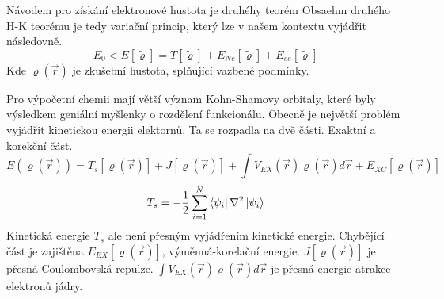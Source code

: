 \documentclass[
  digital, %
  table,   %
  lof,     %
  lot,     %
  oneside,
]{fithesis3}
\begin{document}
Návodem pro získání elektronové hustota je druhéhy teorém Obsaehm druhého H-K teorému je tedy variační princip, který lze v našem kontextu vyjádřit následovně.
\begin{equation}
E_0 < E [\tilde{\varrho}] = T[\tilde{\varrho}] + E_{Ne}[\tilde{\varrho}] + E_{ee}[\tilde{\varrho}]
\end{equation}
Kde $\tilde{\varrho}(\vec{r})$ je zkušební hustota, splňující vazbené podmínky.

 Pro výpočetní chemii mají větší význam Kohn-Shamovy orbitaly, které byly výsledkem geniální myšlenky o rozdělení funkcionálu. Obecně je největší problém vyjádřit kinetickou energii elektornů. Ta se rozpadla na dvě části. Exaktní a korekční část.
\begin{equation}
E(\varrho(\vec{r})) = T_s[\varrho(\vec{r})] + J[\varrho(\vec{r})] + \int V_{EX}(\vec{r})\varrho(\vec{r})d\vec{r} + E_{XC}[\varrho(\vec{r})]
\end{equation}
 \cite{jensen2007introduction}\cite{koch2000chemist}
 \begin{equation}
 T_s = -\frac{1}{2} \sum_{i=1}^{N}  \bra{\psi_i}{\nabla^{2}}\ket{\psi_i}
 \label{kineticka_energie_jednoelektronova}
 \end{equation}
 Kinetická energie $T_s$ ale není přesným vyjádřením kinetické energie. Chybějící část je zajištěna $E_{EX}[\varrho(\vec{r})]$, výměnná-korelační energie. $J[\varrho(\vec{r})]$ je přesná Coulombovská repulze. $\int V_{EX}(\vec{r})\varrho(\vec{r})d\vec{r}$ je přesná energie atrakce elektronů jádry.  \cite{parr1994density}
\end{document}
